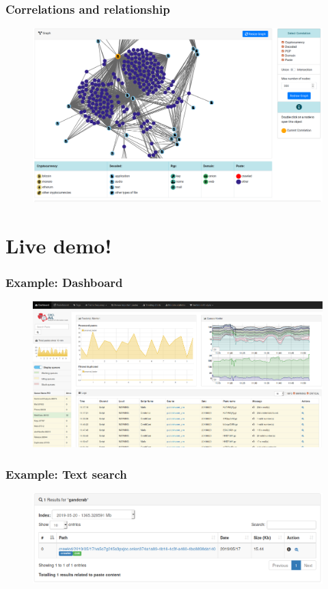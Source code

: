 \documentclass{beamer}
\begin{document}
\begin{frame}
    \frametitle{Correlations and relationship}
    \begin{figure}
        \includegraphics[scale=0.18, angle=0]{images/ail-correlation.png}
    \end{figure}
\end{frame}

\section{Live demo!}

\begin{frame}
    \frametitle{Example: Dashboard}
    \begin{figure}
        \includegraphics[scale=0.18, angle=0]{screenshot/dashboard.png}
    \end{figure}
\end{frame}


\begin{frame}
    \frametitle{Example: Text search}
    \begin{figure}
        \includegraphics[scale=0.3, angle=0]{images/ail_02.png}
    \end{figure}
\end{frame}
\end{document}
